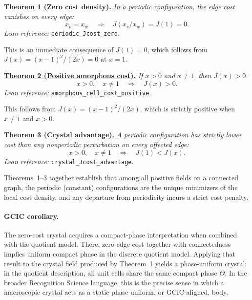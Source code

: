 \documentclass[prb,twocolumn,nofootinbib,superscriptaddress]{revtex4-2}
\newcommand{\J}{J}
\newcommand{\lean}[1]{\texttt{\small #1}}
\begin{document}
\vspace{2mm}
\underline{\bf Theorem 1 (Zero cost density).}
\emph{In a periodic configuration, the edge cost vanishes on every edge:}
\begin{equation}
x_v = x_w \quad \Longrightarrow \quad \J(x_v / x_w) = \J(1) = 0.
\label{eq:zero_cost}
\end{equation}
\emph{Lean reference:} \lean{periodic\_Jcost\_zero}.
\vspace{2mm}

This is an immediate consequence of $\J(1) = 0$, which follows from $\J(x) = (x-1)^2/(2x) = 0$ at $x = 1$.

\vspace{2mm}
\underline{\bf Theorem 2 (Positive amorphous cost).}
\emph{If $x > 0$ and $x \neq 1$, then $\J(x) > 0$.}
\begin{equation}
x > 0, \quad x \neq 1 \quad \Longrightarrow \quad \J(x) > 0.
\label{eq:positive_cost}
\end{equation}
\emph{Lean reference:} \lean{amorphous\_cell\_cost\_positive}.
\vspace{2mm}

This follows from $\J(x) = (x-1)^2/(2x)$, which is strictly positive when $x \neq 1$ and $x > 0$.

\vspace{2mm}
\underline{\bf Theorem 3 (Crystal advantage).}
\emph{A periodic configuration has strictly lower cost than any nonperiodic perturbation on every affected edge:}
\begin{equation}
x > 0, \quad x \neq 1 \quad \Longrightarrow \quad \J(1) < \J(x).
\label{eq:advantage}
\end{equation}
\emph{Lean reference:} \lean{crystal\_Jcost\_advantage}.
\vspace{2mm}

Theorems~1--3 together establish that among all positive fields on a connected graph, the periodic (constant) configurations are the unique minimizers of the local cost density, and any departure from periodicity incurs a strict cost penalty.

\paragraph{GCIC corollary.}
The zero-cost crystal acquires a compact-phase interpretation when combined with the quotient model.
There, zero edge cost together with connectedness implies uniform compact phase in the discrete quotient model.
Applying that result to the crystal field produced by Theorem~1 yields a phase-uniform crystal: in the quotient description, all unit cells share the same compact phase $\Theta$.
In the broader Recognition Science language, this is the precise sense in which a macroscopic crystal acts as a static phase-uniform, or GCIC-aligned, body.
\end{document}
